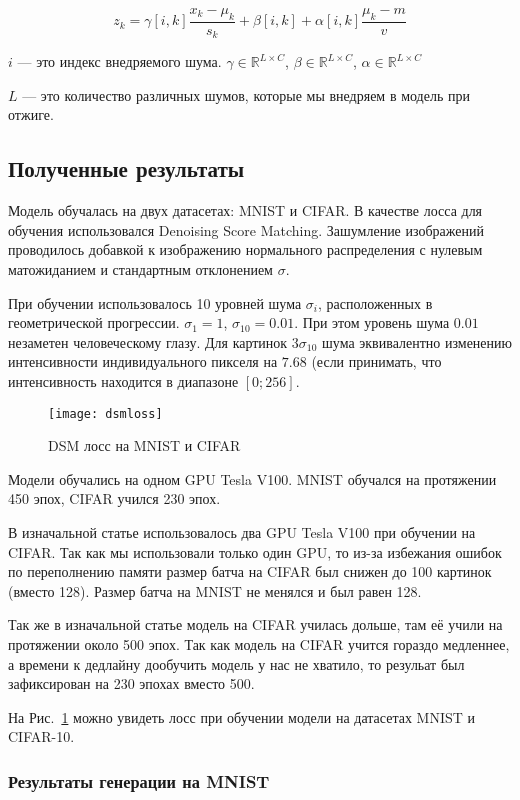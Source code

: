 \documentclass{article}
\begin{document}
\[
z_k = \gamma[i, k] \frac{x_k - \mu_k}{s_k} + \beta[i,k] + \alpha[i,k]\frac{\mu_k - m}{v}
\]

$i$ --- это индекс внедряемого шума.
$\gamma \in \mathbb{R}^{L \times C}$, $\beta \in \mathbb{R}^{L \times C}$, $\alpha \in \mathbb{R}^{L \times C}$

$L$ --- это количество различных шумов, которые мы внедряем в модель при отжиге.

\subsection{Полученные результаты}

Модель обучалась на двух датасетах: MNIST и CIFAR. В качестве лосса для
обучения использовался Denoising Score Matching. Зашумление изображений
проводилось добавкой к изображению нормального распределения с нулевым
матожиданием и стандартным отклонением $\sigma$.

При обучении использовалось 10 уровней шума $\sigma_i$, расположенных
в геометрической прогрессии. $\sigma_1 = 1$, $\sigma_{10} = 0.01$.
При этом уровень шума $0.01$ незаметен человеческому глазу. Для
картинок $3\sigma_{10}$ шума эквивалентно изменению интенсивности
индивидуального пикселя на $7.68$ (если принимать, что интенсивность
находится в диапазоне $[0; 256]$.

\begin{figure}
    \centering
    \texttt{[image: dsmloss]}
    \caption{DSM лосс на MNIST и CIFAR}\label{fig:dsmloss}
\end{figure}

Модели обучались на одном GPU Tesla V100. MNIST обучался
на протяжении 450 эпох, CIFAR учился 230 эпох.

В изначальной статье использовалось два GPU Tesla V100 при
обучении на CIFAR. Так как мы использовали только один GPU,
то из-за избежания ошибок по переполнению памяти размер
батча на CIFAR был снижен до 100 картинок (вместо 128).
Размер батча на MNIST не менялся и был равен 128.

Так же в изначальной статье модель на CIFAR училась дольше,
там её учили на протяжении около 500 эпох. Так как модель
на CIFAR учится гораздо медленнее, а времени к дедлайну
дообучить модель у нас не хватило, то резульат был зафиксирован
на 230 эпохах вместо 500.

На Рис.~\ref{fig:dsmloss} можно увидеть лосс при обучении
модели на датасетах MNIST и CIFAR-10.

\subsubsection{Результаты генерации на MNIST}
\end{document}

